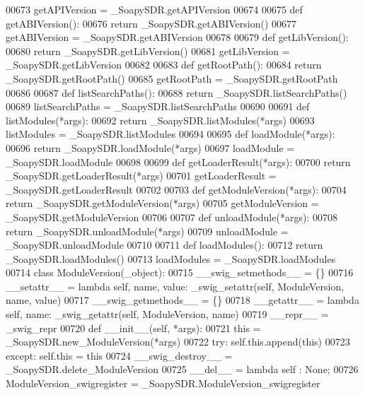 \begin{DoxyCode}
{{{{{00673 getAPIVersion = \_SoapySDR.getAPIVersion
00674 
00675 \textcolor{keyword}{def }getABIVersion():
00676   \textcolor{keywordflow}{return} \_SoapySDR.getABIVersion()
00677 getABIVersion = \_SoapySDR.getABIVersion
00678 
00679 \textcolor{keyword}{def }getLibVersion():
00680   \textcolor{keywordflow}{return} \_SoapySDR.getLibVersion()
00681 getLibVersion = \_SoapySDR.getLibVersion
00682 
00683 \textcolor{keyword}{def }getRootPath():
00684   \textcolor{keywordflow}{return} \_SoapySDR.getRootPath()
00685 getRootPath = \_SoapySDR.getRootPath
00686 
00687 \textcolor{keyword}{def }listSearchPaths():
00688   \textcolor{keywordflow}{return} \_SoapySDR.listSearchPaths()
00689 listSearchPaths = \_SoapySDR.listSearchPaths
00690 
00691 \textcolor{keyword}{def }listModules(*args):
00692   \textcolor{keywordflow}{return} \_SoapySDR.listModules(*args)
00693 listModules = \_SoapySDR.listModules
00694 
00695 \textcolor{keyword}{def }loadModule(*args):
00696   \textcolor{keywordflow}{return} \_SoapySDR.loadModule(*args)
00697 loadModule = \_SoapySDR.loadModule
00698 
00699 \textcolor{keyword}{def }getLoaderResult(*args):
00700   \textcolor{keywordflow}{return} \_SoapySDR.getLoaderResult(*args)
00701 getLoaderResult = \_SoapySDR.getLoaderResult
00702 
00703 \textcolor{keyword}{def }getModuleVersion(*args):
00704   \textcolor{keywordflow}{return} \_SoapySDR.getModuleVersion(*args)
00705 getModuleVersion = \_SoapySDR.getModuleVersion
00706 
00707 \textcolor{keyword}{def }unloadModule(*args):
00708   \textcolor{keywordflow}{return} \_SoapySDR.unloadModule(*args)
00709 unloadModule = \_SoapySDR.unloadModule
00710 
00711 \textcolor{keyword}{def }loadModules():
00712   \textcolor{keywordflow}{return} \_SoapySDR.loadModules()
00713 loadModules = \_SoapySDR.loadModules
00714 \textcolor{keyword}{class }ModuleVersion(_object):
00715     \_\_swig\_setmethods\_\_ = \{\}
00716     \_\_setattr\_\_ = \textcolor{keyword}{lambda} self, name, value: _swig_setattr(self, ModuleVersion, name, value)
00717     \_\_swig\_getmethods\_\_ = \{\}
00718     \_\_getattr\_\_ = \textcolor{keyword}{lambda} self, name: _swig_getattr(self, ModuleVersion, name)
00719     \_\_repr\_\_ = \_swig\_repr
00720     \textcolor{keyword}{def }__init__(self, *args): 
00721         this = \_SoapySDR.new\_ModuleVersion(*args)
00722         \textcolor{keywordflow}{try}: self.this.append(this)
00723         \textcolor{keywordflow}{except}: self.this = this
00724     \_\_swig\_destroy\_\_ = \_SoapySDR.delete\_ModuleVersion
00725     \_\_del\_\_ = \textcolor{keyword}{lambda} self : \textcolor{keywordtype}{None};
00726 ModuleVersion\_swigregister = \_SoapySDR.ModuleVersion\_swigregister
}}}}}
\end{DoxyCode}
